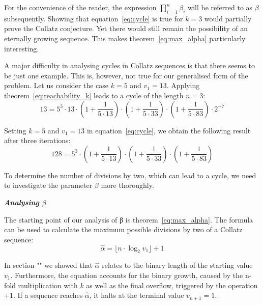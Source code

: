 \documentclass{SciPress_2015}
\renewcommand{\subsection}[1]{\textit{\textbf{#1}}}
\begin{document}
\par\medskip
For the convenience of the reader, the expression $\prod_{i=1}^{n}\beta_i$ will be referred to as $\beta$ subsequently. Showing that equation~\ref{eq:cycle} is true for $k=3$ would partially prove the Collatz conjecture. Yet there would still remain the possibility of an eternally growing sequence. This makes theorem~\ref{eq:max_alpha} particularly interesting.

\par\medskip
A major difficulty in analysing cycles in Collatz sequences is that there seems to be just one example. This is, however, not true for our generalised form of the problem. Let us consider the case $k=5$ and $v_1=13$. Applying theorem~\ref{eq:reachability_k} leads to a cycle of the length $n=3$:
\[
13=5^3\cdot13\cdot\left(1+\frac{1}{5\cdot13}\right)\cdot\left(1+\frac{1}{5\cdot33}\right)\cdot\left(1+\frac{1}{5\cdot83}\right)\cdot2^{-7}
\]

Setting $k=5$ and $v_1=13$ in equation~\ref{eq:cycle}, we obtain the following result after three iterations:
\[
128=5^3\cdot\left(1+\frac{1}{5\cdot13}\right)\cdot\left(1+\frac{1}{5\cdot33}\right)\cdot\left(1+\frac{1}{5\cdot83}\right)
\]

To determine the number of divisions by two, which can lead to a cycle, we need to investigate the parameter $\beta$ more thoroughly.

\vspace{1em}\noindent
\subsection{Analysing \boldmath$\beta$}
\par\noindent
The starting point of our analysis of β is theorem~\ref{eq:max_alpha}. The formula can be used to calculate the maximum possible divisions by two of a Collatz sequence:
\[
\hat\alpha=\lfloor n\cdot\log_2v_1\rfloor+1
\]

In section "" we showed that $\hat\alpha$ relates to the binary length of the starting value $v_1$. Furthermore, the equation accounts for the binary growth, caused by the n-fold multiplication with $k$ as well as the final overflow, triggered by the operation $+1$. If a sequence reaches $\hat\alpha$, it halts at the terminal value $v_{n+1}=1$.
\end{document}
